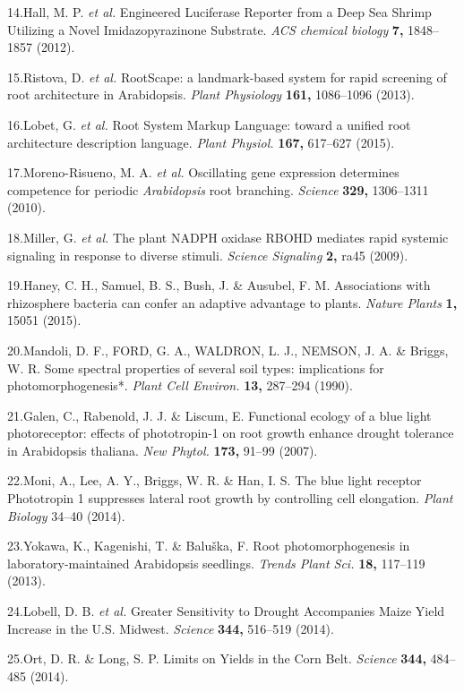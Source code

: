 \documentclass[]{article}
\begin{document}
14.Hall, M. P. \emph{et al.} Engineered Luciferase Reporter from a Deep
Sea Shrimp Utilizing a Novel Imidazopyrazinone Substrate. \emph{ACS
chemical biology} \textbf{7,} 1848--1857 (2012).

15.Ristova, D. \emph{et al.} RootScape: a landmark-based system for
rapid screening of root architecture in Arabidopsis. \emph{Plant
Physiology} \textbf{161,} 1086--1096 (2013).

16.Lobet, G. \emph{et al.} Root System Markup Language: toward a unified
root architecture description language. \emph{Plant Physiol.}
\textbf{167,} 617--627 (2015).

17.Moreno-Risueno, M. A. \emph{et al.} Oscillating gene expression
determines competence for periodic \emph{Arabidopsis} root branching.
\emph{Science} \textbf{329,} 1306--1311 (2010).

18.Miller, G. \emph{et al.} The plant NADPH oxidase RBOHD mediates rapid
systemic signaling in response to diverse stimuli. \emph{Science
Signaling} \textbf{2,} ra45 (2009).

19.Haney, C. H., Samuel, B. S., Bush, J. \& Ausubel, F. M. Associations
with rhizosphere bacteria can confer an adaptive advantage to plants.
\emph{Nature Plants} \textbf{1,} 15051 (2015).

20.Mandoli, D. F., FORD, G. A., WALDRON, L. J., NEMSON, J. A. \& Briggs,
W. R. Some spectral properties of several soil types: implications for
photomorphogenesis*. \emph{Plant Cell Environ.} \textbf{13,} 287--294
(1990).

21.Galen, C., Rabenold, J. J. \& Liscum, E. Functional ecology of a blue
light photoreceptor: effects of phototropin-1 on root growth enhance
drought tolerance in Arabidopsis thaliana. \emph{New Phytol.}
\textbf{173,} 91--99 (2007).

22.Moni, A., Lee, A. Y., Briggs, W. R. \& Han, I. S. The blue light
receptor Phototropin 1 suppresses lateral root growth by controlling
cell elongation. \emph{Plant Biology} 34--40 (2014).

23.Yokawa, K., Kagenishi, T. \& Balu{š}ka, F. Root photomorphogenesis in
laboratory-maintained Arabidopsis seedlings. \emph{Trends Plant Sci.}
\textbf{18,} 117--119 (2013).

24.Lobell, D. B. \emph{et al.} Greater Sensitivity to Drought
Accompanies Maize Yield Increase in the U.S. Midwest. \emph{Science}
\textbf{344,} 516--519 (2014).

25.Ort, D. R. \& Long, S. P. Limits on Yields in the Corn Belt.
\emph{Science} \textbf{344,} 484--485 (2014).
\end{document}
